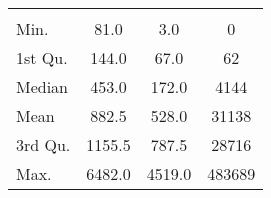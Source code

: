\begin{tabular}{lS[table-format=5.1]S[table-format=5.1]S[table-format=5.1]}
&  &  &  \\
 Min.    & 81.0 & 3.0 & 0 \\
 1st Qu. & 144.0 & 67.0 & 62 \\
 Median  & 453.0 & 172.0 & 4144 \\
 Mean    & 882.5 & 528.0 & 31138 \\
 3rd Qu. & 1155.5 & 787.5 & 28716 \\
 Max.    & 6482.0 & 4519.0 & 483689 \\
\end{tabular}
